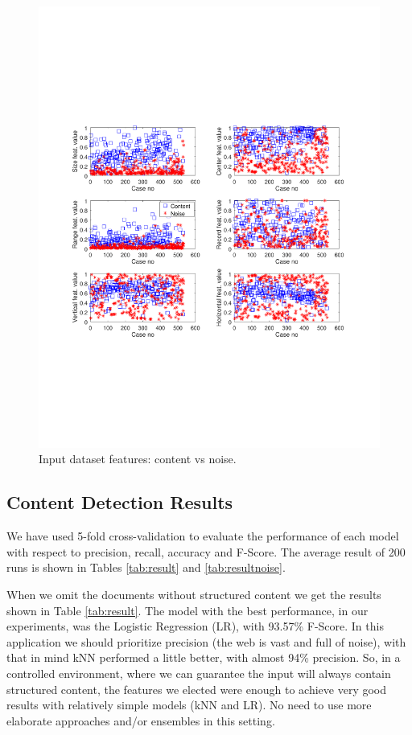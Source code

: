 \begin{figure}[h]
  \centering
     \includegraphics[trim={2.0cm 7.0cm 0.7cm 7.4cm}, clip,  width=\columnwidth]{img/dataset.pdf}
  \caption{Input dataset features: content vs noise.}
  \label{fig:dataset}
\end{figure}


\subsection{Content Detection Results}\label{sec:results}
We have used 5-fold cross-validation to evaluate the performance
of each model with respect to precision, recall, accuracy and F-Score. The
average result of 200 runs is shown in Tables \ref{tab:result} and
\ref{tab:resultnoise}.

When we omit the documents without structured content we get the results shown
in Table \ref{tab:result}. The model with the best performance, in our
experiments, was the Logistic Regression (LR), with 93.57\% F-Score. In this
application we should prioritize precision (the web is vast and full of noise),
with that in mind kNN performed a little better, with almost 94\% precision. So,
in a controlled environment, where we can guarantee the input will always
contain structured content, the features we elected were enough to achieve very
good results with relatively simple models (kNN and LR). No need to use more
elaborate approaches and/or ensembles in this setting.

